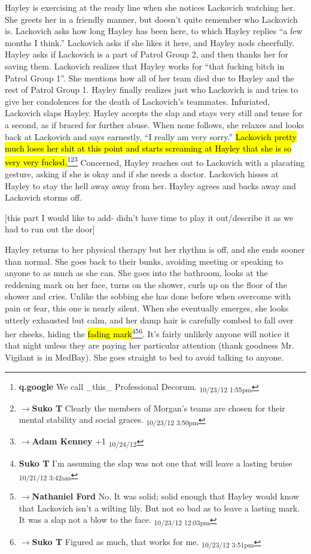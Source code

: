 Hayley is exercising at the ready line when she notices Lackovich watching her.  She greets her in a friendly manner, but doesn't quite remember who Lackovich is.  Lackovich asks how long Hayley has been here, to which Hayley replies ``a few months I think.''  Lackovich asks if she likes it here, and Hayley nods cheerfully.  Hayley asks if Lackovich is a part of Patrol Group 2, and then thanks her for saving them.  Lackovich realizes that Hayley works for ``that fucking bitch in Patrol Group 1''.  She mentions how all of her team died due to Hayley and the rest of Patrol Group 1.  Hayley finally realizes just who Lackovich is and tries to give her condolences for the death of Lackovich's teammates.  Infuriated, Lackovich slaps Hayley.  Hayley accepts the slap and stays very still and tense for a second, as if braced for further abuse.  When none follows, she relaxes and looks back at Lackovich and says earnestly, ``I really am very sorry.''  \hl{Lackovich pretty much loses her shit at this point and starts screaming at Hayley that she is so very very fucked.}\footnote{\textbf{q.google }We call \_this\_ Professional Decorum. \textsubscript{10/23/12 1:55pm}}\footnote{$\rightarrow$\textbf{Suko T }Clearly the members of Morgan's teams are chosen for their mental stability and social graces. \textsubscript{10/23/12 3:50pm}}\footnote{$\rightarrow$\textbf{Adam Kenney }+1 \textsubscript{10/24/12}}  Concerned, Hayley reaches out to Lackovich with a placating gesture, asking if she is okay and if she needs a doctor.  Lackovich hisses at Hayley to stay the hell away away from her.   Hayley agrees and backs away and Lackovich storms off.



{[}this part I would like to add- didn't have time to play it out/describe it as we had to run out the door{]}

Hayley returns to her physical therapy but her rhythm is off, and she ends sooner than normal.  She goes back to their bunks, avoiding meeting or speaking to anyone to as much as she can.  She goes into the bathroom, looks at the reddening mark on her face, turns on the shower, curls up on the floor of the shower and cries.  Unlike the sobbing she has done before when overcome with pain or fear, this one is nearly silent.  When she eventually emerges, she looks utterly exhausted but calm, and her damp hair is carefully combed to fall over her cheeks, hiding the \hl{fading mark}\footnote{\textbf{Suko T }I'm assuming the slap was not one that will leave a lasting bruise \textsubscript{10/21/12 3:42am}}\footnote{$\rightarrow$\textbf{Nathaniel Ford }No. It was solid; solid enough that Hayley would know that Lackovich isn't a wilting lily. But not so bad as to leave a lasting mark. It was a slap not a blow to the face. \textsubscript{10/23/12 12:03pm}}\footnote{$\rightarrow$\textbf{Suko T }Figured as much, that works for me. \textsubscript{10/23/12 3:51pm}}.  It's fairly unlikely anyone will notice it that night unless they are paying her particular attention (thank goodness Mr. Vigilant is in MedBay).  She goes straight to bed to avoid talking to anyone.



